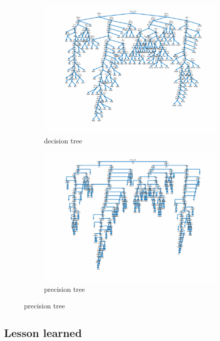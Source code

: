 \documentclass{article}
\begin{document}
\begin{figure}[h]
	\centering
	\begin{subfigure}[a]{0.55\textwidth}
		\includegraphics[width=1\linewidth]{decision_tree.png}
		\caption{decision tree}
	\end{subfigure}
	\begin{subfigure}[b]{0.55\textwidth}
		\includegraphics[width=1\linewidth]{precision_tree.png}
		\caption{precision tree}
	\end{subfigure}
\end{figure}

\subsection{Lesson learned}
\end{document}
